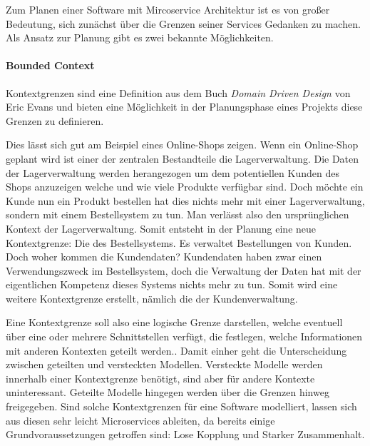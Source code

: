 \documentclass[12pt,a4paper,bibliography=totocnumbered,listof=totocnumbered]{scrartcl}
\begin{document}
Zum Planen einer Software mit Mircoservice Architektur ist es von großer Bedeutung, sich zunächst über die Grenzen seiner Services Gedanken zu machen. Als Ansatz zur Planung gibt es zwei bekannte Möglichkeiten.

\paragraph{Bounded Context} Kontextgrenzen sind eine Definition aus dem Buch \textit{Domain Driven Design} von Eric Evans \cite{dddesign} und bieten eine Möglichkeit in der Planungsphase eines Projekts diese Grenzen zu definieren.

Dies lässt sich gut am Beispiel eines Online-Shops zeigen. Wenn ein Online-Shop geplant wird ist einer der zentralen Bestandteile die Lagerverwaltung. Die Daten der Lagerverwaltung werden herangezogen um dem potentiellen Kunden des Shops anzuzeigen welche und wie viele Produkte verfügbar sind. Doch möchte ein Kunde nun ein Produkt bestellen hat dies nichts mehr mit einer Lagerverwaltung, sondern mit einem Bestellsystem zu tun. Man verlässt also den ursprünglichen Kontext der Lagerverwaltung. Somit entsteht in der Planung eine neue Kontextgrenze: Die des Bestellsystems. Es verwaltet Bestellungen von Kunden. Doch woher kommen die Kundendaten? Kundendaten haben zwar einen Verwendungszweck im Bestellsystem, doch die Verwaltung der Daten hat mit der eigentlichen Kompetenz dieses Systems nichts mehr zu tun. Somit wird eine weitere Kontextgrenze erstellt, nämlich die der Kundenverwaltung.


Eine Kontextgrenze soll also eine logische Grenze darstellen, welche eventuell über eine oder mehrere Schnittstellen verfügt, die festlegen, welche Informationen mit anderen Kontexten geteilt werden.\cite[S.65]{buildingms}. Damit einher geht die Unterscheidung zwischen geteilten und versteckten Modellen. Versteckte Modelle werden innerhalb einer Kontextgrenze benötigt, sind aber für andere Kontexte uninteressant. Geteilte Modelle hingegen werden über die Grenzen hinweg freigegeben. Sind solche Kontextgrenzen für eine Software modelliert, lassen sich aus diesen sehr leicht Microservices ableiten, da bereits einige Grundvoraussetzungen getroffen sind: Lose Kopplung und Starker Zusammenhalt.\cite[S.68]{buildingms}

\end{document}
